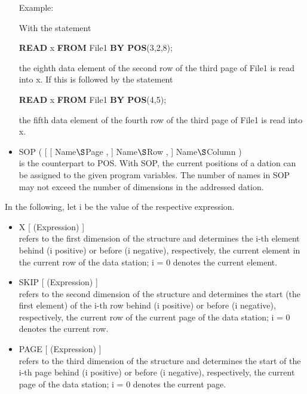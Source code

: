 \begin{itemize}
Example:

With the statement

{\bf READ} x {\bf FROM} File1 {\bf BY POS}(3,2,8);

the eighth data element of the second row of the third page of File1 is
read into x. If this is followed by the statement

{\bf READ} x {\bf FROM} File1 {\bf BY POS}(4,5);

the fifth data element of the fourth row of the third page of File1 is
read into x.
\item SOP ( [ [ Name$\S $Page , ] Name$\S $Row , ] Name$\S $Column )\\
is the counterpart to POS. With SOP, the current positions of a dation
can be assigned to the given program variables. The number of names in
SOP may not exceed the number of dimensions in the addressed dation.
\end{itemize}

In the following, let i be the value of the respective expression.
\begin{itemize}
\item X [ (Expression) ]\\
refers to the first dimension of the structure and determines the i-th
element behind (i positive) or before (i negative), respectively, the
current element in the current row of the data station; i = 0 denotes
the current element.
\item SKIP [ (Expression) ]\\
refers to the second dimension of the structure and determines the start
(the first element) of the i-th row behind (i positive) or before (i
negative), respectively, the current row of the current page of the data
station; i = 0 denotes the current row.
\item PAGE [ (Expression) ]\\
refers to the third dimension of the structure and determines the start
of the i-th page behind (i positive) or before (i negative),
respectively, the current page of the data station; i = 0 denotes the
current page.
\end{itemize}

